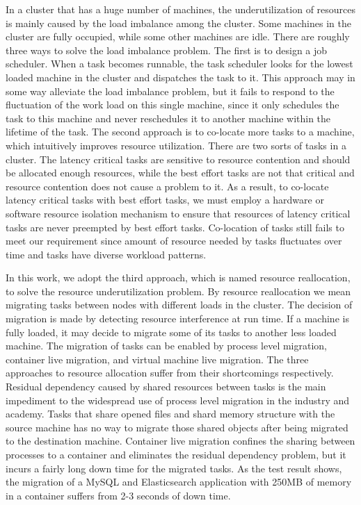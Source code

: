\begin{bigabstract}
In a cluster that has a huge number of machines, the underutilization of resources is mainly caused by the load imbalance among the cluster. Some machines in the cluster are fully occupied, while some other machines are idle. There are roughly three ways to solve the load imbalance problem. The first is to design a job scheduler. When a task becomes runnable, the task scheduler looks for the lowest loaded machine in the cluster and dispatches the task to it. This approach may in some way alleviate the load imbalance problem, but it fails to respond to the fluctuation of the work load on this single machine, since it only schedules the task to this machine and never reschedules it to another machine within the lifetime of the task. The second approach is to co-locate more tasks to a machine, which intuitively improves resource utilization. There are two sorts of tasks in a cluster. The latency critical tasks are sensitive to resource contention and should be allocated enough resources, while the best effort tasks are not that critical and resource contention does not cause a problem to it. As a result, to co-locate latency critical tasks with best effort tasks, we must employ a hardware or software resource isolation mechanism to ensure that resources of latency critical tasks are never preempted by best effort tasks. Co-location of tasks still fails to meet our requirement since amount of resource needed by tasks fluctuates over time and tasks have diverse workload patterns. 

In this work, we adopt the third approach, which is named resource reallocation, to solve the resource underutilization problem. By resource reallocation we mean migrating tasks between nodes with different loads in the cluster. The decision of migration is made by detecting resource interference at run time. If a machine is fully loaded, it may decide to migrate some of its tasks to another less loaded machine. The migration of tasks can be enabled by process level migration, container live migration, and virtual machine live migration. The three approaches to resource allocation suffer from their shortcomings respectively. Residual dependency caused by shared resources between tasks is the main impediment to the widespread use of process level migration in the industry and academy. Tasks that share opened files and shard memory structure with the source machine has no way to migrate those shared objects after being migrated to the destination machine. Container live migration confines the sharing between processes to a container and eliminates the residual dependency problem, but it incurs a fairly long down time for the migrated tasks. As the test result shows, the migration of a MySQL and Elasticsearch application with 250MB of memory in a container suffers from 2-3 seconds of down time.


\end{bigabstract}

